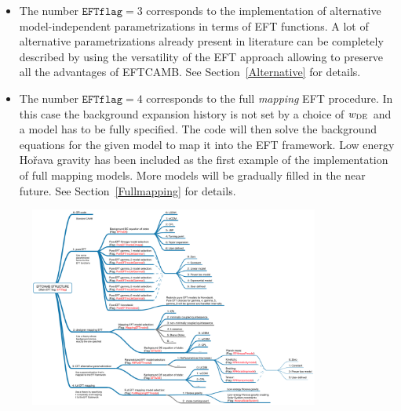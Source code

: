 \documentclass[prd,nofootinbib,showpacs]{revtex4}
\begin{document}
{\begin{itemize}
For the \textit{mapping} case the user can investigate a particular DE/MG model once the matching with the EFT functions is provided and the background evolution has been implemented in the EFT code. \\
The model selection flag for the \textit{mapping} EFT procedure is \texttt{DesignerEFTmodel}.
Various models are already included in the code  (see the blue lines in the Flowchart~\ref{Fig:StructureFlowChart}) and their implementation details are presented in Section~\ref{Sec:MatchingEFT}. 
Models corresponding to the grey lines in the Flowchart~\ref{Fig:StructureFlowChart} are some of the models that can be cast into the EFT formalism and that will be gradually implemented in future code releases.
\item The number $\texttt{EFTflag}=3$  corresponds to the implementation of alternative model-independent parametrizations in terms of EFT functions.   A lot of alternative parametrizations already present in literature can be completely described by using the versatility of the EFT approach allowing to preserve all the advantages of EFTCAMB. See Section~\ref{Alternative} for details.
\item The number $\texttt{EFTflag}=4$  corresponds to the full \textit{mapping} EFT procedure. In this case the background expansion history is not set by a choice of $w_{\rm DE}$ and a model has to be fully specified. The code will then solve the background equations for the given model to map it into the EFT framework. Low energy Ho\v rava gravity has been included as the first example of the implementation of full mapping models. More models will be gradually filled in the near future. See Section~\ref{Fullmapping} for details.
\end{itemize}
%
\begin{figure}[!tp]
\begin{center}
 \includegraphics[width=0.85\textwidth]{images/EFTCAMB_model_flags_V2}

\end{center}
\end{figure}}
\end{document}
